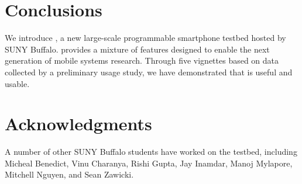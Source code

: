 \section{Conclusions}
\label{sec-conclusions}

We introduce \PhoneLab{}, a new large-scale programmable smartphone testbed
hosted by SUNY Buffalo. \PhoneLab{} provides a mixture of features designed
to enable the next generation of mobile systems research. Through five
vignettes based on data collected by a preliminary usage study, we have
demonstrated that \PhoneLab{} is useful and usable.

\section*{Acknowledgments}

A number of other SUNY Buffalo students have worked on the \PhoneLab{}
testbed, including Micheal Benedict, Vinu Charanya, Rishi Gupta, Jay Inamdar,
Manoj Mylapore, Mitchell Nguyen, and Sean Zawicki.
